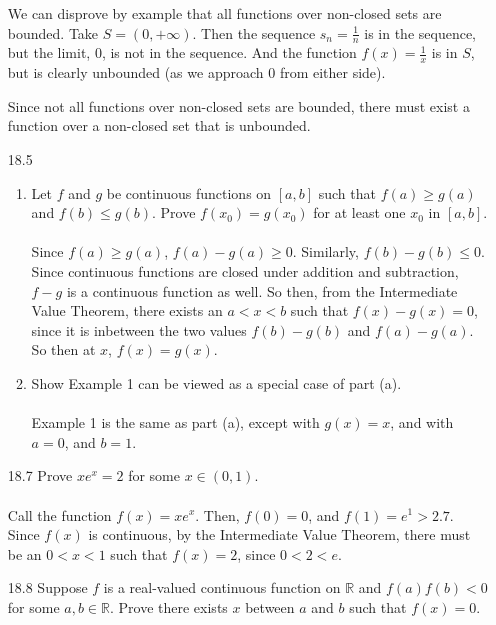 \begin{enumerate}
    We can disprove by example that all functions over non-closed sets are bounded. Take $S = (0,+\infty)$. Then the sequence $s_n = \frac{1}{n}$ is in the sequence, but the limit, $0$, is not in the sequence. And the function $f(x) = \frac{1}{x}$ is in $S$, but is clearly unbounded (as we approach $0$ from either side).

    Since not all functions over non-closed sets are bounded, there must exist a function over a non-closed set that is unbounded.
  \item [18.5]
    \begin{enumerate}
      \item Let $f$ and $g$ be continuous functions on $[a,b]$ such that $f(a) \geq g(a)$ and $f(b) \leq g(b)$. Prove $f(x_0) = g(x_0)$ for at least one $x_0$ in $[a,b]$.\\\\

        Since $f(a) \geq g(a)$, $f(a) - g(a) \geq 0$. Similarly, $f(b) - g(b) \leq 0$. Since continuous functions are closed under addition and subtraction, $f-g$ is a continuous function as well. So then, from the Intermediate Value Theorem, there exists an $a < x < b$ such that $f(x) - g(x) = 0$, since it is inbetween the two values $f(b)-g(b)$ and $f(a)-g(a)$. So then at $x$, $f(x) = g(x)$.
      \item Show Example 1 can be viewed as a special case of part (a).\\\\

        Example 1 is the same as part (a), except with $g(x) = x$, and with $a = 0$, and $b = 1$.
    \end{enumerate}
  \item [18.7]
    Prove $xe^x = 2$ for some $x \in (0,1)$.\\\\

    Call the function $f(x) = xe^x$. Then, $f(0) = 0$, and $f(1) = e^1 > 2.7$. Since $f(x)$ is continuous, by the Intermediate Value Theorem, there must be an $0 < x < 1$ such that $f(x) = 2$, since $0 < 2 < e$.
  \item [18.8]
    Suppose $f$ is a real-valued continuous function on $\mathds{R}$ and $f(a)f(b) < 0$ for some $a,b \in \mathds{R}$. Prove there exists $x$ between $a$ and $b$ such that $f(x) = 0$.\\\\


\end{enumerate}
